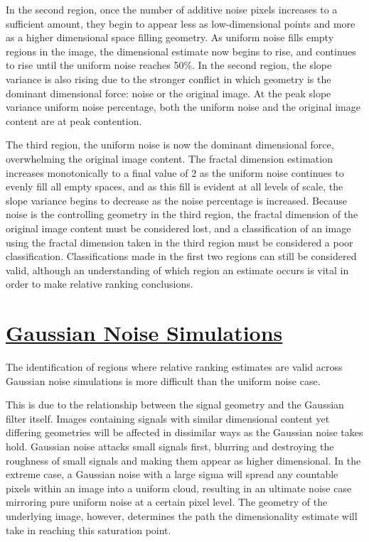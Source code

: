 \documentclass[12pt, oneside]{book}
\begin{document}
In the second region, once the number of additive noise pixels increases to a sufficient amount, they begin to appear less as low-dimensional points and more as a higher dimensional space filling geometry.  As uniform noise fills empty regions in the image, the dimensional estimate now begins to rise, and continues to rise until the uniform noise reaches 50\%.  In the second region, the slope variance is also rising due to the stronger conflict in which geometry is the dominant dimensional force: noise or the original image.  At the peak slope variance uniform noise percentage, both the uniform noise and the original image content are at peak contention.

The third region, the uniform noise is now the dominant dimensional force, overwhelming the original image content.  The fractal dimension estimation increases monotonically to a final value of 2 as the uniform noise continues to evenly fill all empty spaces, and as this fill is evident at all levels of scale, the slope variance begins to decrease as the noise percentage is increased.  Because noise is the controlling geometry in the third region, the fractal dimension of the original image content must be considered lost, and a classification of an image using the fractal dimension taken in the third region must be considered a poor classification.  Classifications made in the first two regions can still be considered valid, although an understanding of which region an estimate occurs is vital in order to make relative ranking conclusions.

\section{\underline{Gaussian Noise Simulations}}
The identification of regions where relative ranking estimates are valid across Gaussian noise simulations is more difficult than the uniform noise case.  

This is due to the relationship between the signal geometry and the Gaussian filter itself.  Images containing signals with similar dimensional content yet differing geometries will be affected in dissimilar ways as the Gaussian noise takes hold.  Gaussian noise attacks small signals first, blurring and destroying the roughness of small signals and making them appear as higher dimensional.  In the extreme case, a Gaussian noise with a large sigma will spread any countable pixels within an image into a uniform cloud, resulting in an ultimate noise case mirroring pure uniform noise at a certain pixel level.  The geometry of the underlying image, however, determines the path the dimensionality estimate will take in reaching this saturation point.
\end{document}
